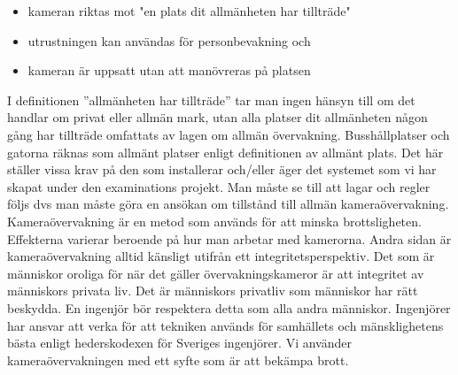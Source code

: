 \begin{itemize}
\item kameran riktas mot "en plats dit allmänheten har tillträde"

\item utrustningen kan användas för personbevakning och

\item kameran är uppsatt utan att manövreras på platsen
\end{itemize}
I definitionen ”allmänheten har tillträde” tar man ingen hänsyn till om det handlar om privat eller allmän mark, utan alla platser dit allmänheten någon gång har tillträde omfattats av lagen om allmän övervakning. Busshållplatser och gatorna räknas som allmänt platser enligt definitionen av allmänt plats.  Det här ställer vissa krav på den som installerar och/eller äger det systemet som vi har skapat under den examinations projekt. Man måste se till att lagar och regler följs dvs man måste göra en ansökan om tillstånd till allmän kameraövervakning. 
Kameraövervakning är en metod som används för att minska brottsligheten. Effekterna varierar beroende på hur man arbetar med kamerorna. Andra sidan är kameraövervakning alltid känsligt utifrån ett integritetsperspektiv. Det som är människor oroliga för när det gäller övervakningskameror är att integritet av människors privata liv.  Det är människors privatliv som människor har rätt beskydda. En ingenjör bör respektera detta som alla andra människor. Ingenjörer har ansvar att verka för att tekniken används för samhällets och mänsklighetens bästa enligt hederskodexen för Sveriges ingenjörer. Vi använder kameraövervakningen med ett syfte som är att bekämpa brott. 




